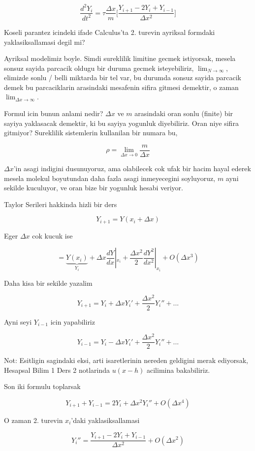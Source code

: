 \documentclass[12pt,fleqn]{article}
\begin{document}
\[ \frac{d^2Y_i}{dt^2} = 
\tau \frac{\Delta x}{m} \bigg[
\frac{Y_{i+1} - 2Y_i + Y_{i-1}}{\Delta x^2}
\bigg]
\]

Koseli parantez icindeki ifade Calculus'ta 2. turevin ayriksal formdaki
yaklasiksallamasi degil mi?

Ayriksal modelimiz boyle. Simdi sureklilik limitine gecmek istiyorsak,
mesela sonsuz sayida parcacik oldugu bir duruma gecmek isteyebiliriz,
$\lim_{N \to \infty}$, elimizde sonlu / belli miktarda bir tel var, bu durumda 
sonsuz sayida parcacik demek bu parcaciklarin arasindaki mesafenin sifira 
gitmesi demektir, o zaman $\lim_{\Delta x \to \infty}$. 

Formul icin bunun anlami nedir? $\Delta x$ ve $m$ arasindaki oran sonlu
(finite) bir sayiya yaklasacak demektir, ki bu sayiya yogunluk
diyebiliriz. Oran niye sifira gitmiyor? Sureklilik sistemlerin kullanilan
bir numara bu,

\[ \rho = \lim_{\Delta x \to 0} \frac{m}{\Delta x} \]

$\Delta x$'in asagi indigini dusunuyoruz, ama olabilecek cok ufak bir hacim
hayal ederek mesela molekul boyutundan daha fazla asagi inmeyecegini
soyluyoruz, $m$ ayni sekilde kuculuyor, ve oran bize bir yogunluk hesabi
veriyor.

Taylor Serileri hakkinda hizli bir ders

\[ Y_{i+1}=Y(x_i + \Delta x) \]

Eger $\Delta x$ cok kucuk ise

\[ = 
\underbrace{Y(x_i)}_{Y_i} + \Delta x \frac{dY}{dx}|_{x_i} + 
\frac{\Delta x^2}{2}\frac{dY^2}{dx^2}|_{x_i} + 
O(\Delta x^3)
\]

Daha kisa bir sekilde yazalim

\[ Y_{i+1} = Y_i + \Delta x Y_i' + \frac{\Delta x^2}{2}Y_i'' + ... 
\]

Ayni seyi $Y_{i-1}$ icin yapabiliriz

\[ Y_{i-1} = Y_i - \Delta x Y_i' + \frac{\Delta x^2}{2}Y_i'' + ... 
\]

Not: Esitligin sagindaki eksi, arti isaretlerinin nereden geldigini merak
ediyorsak, Hesapsal Bilim 1 Ders 2 notlarinda $u(x-h)$ acilimina
bakabiliriz.

Son iki formulu toplarsak

\[ Y_{i+1} + Y_{i-1} = 2Y_i + \Delta x^2 Y_i''  + O(\Delta x^4)\]

O zaman 2. turevin $x_i$'daki yaklasiksallamasi 

\[ Y_i'' = \frac{Y_{i+1} - 2Y_i + Y_{i-1}}{\Delta x^2} + O(\Delta x^2) \]
\end{document}
